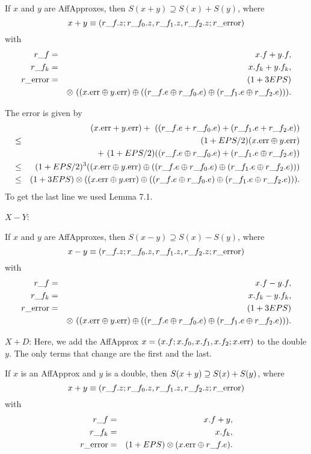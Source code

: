  If $x$ and $y$ are 
{\rm AffApproxes, }
then $S(x + y) \supseteq S(x) + S(y)${\rm ,} where
$$x + y \equiv (r\_f.z; r\_f_0.z, r\_f_1.z, r\_f_2.z; r\_{\rm error})$$
with
\begin{eqnarray*}
r\_f &=& x.f + y.f,\\
r\_f_k &=& x.f_k + y.f_k,\\
r\_{\rm error}& =& (1 + 3EPS)\\
&&\otimes\ ((x.{\rm err} \oplus y.{\rm err}) \oplus ((r\_f.e \oplus
r\_f_0.e) \oplus (r\_f_1.e \oplus r\_f_2.e))).
\end{eqnarray*}
\endproclaim

The error is given by 
\begin{eqnarray*}
&&\hskip-24pt (x.{\rm err} + y.{\rm err})  +\ ((r\_f.e + r\_f_0.e) + (r\_f_1.e + r\_f_2.e))\\
&\le& (1+EPS/2) (x.{\rm err} \oplus
y.{\rm err}) \\
&&+\ (1+EPS/2)((r\_f.e \oplus r\_f_0.e) + (r\_f_1.e \oplus r\_f_2.e))\\
&\le& (1+EPS/2)^3 ((x.{\rm err} \oplus
y.{\rm err}) \oplus ((r\_f.e \oplus r\_f_0.e) \oplus (r\_f_1.e \oplus r\_f_2.e)))\\
&\le& (1 + 3EPS) \otimes ((x.{\rm
err} \oplus y.{\rm err}) \oplus ((r\_f.e \oplus r\_f_0.e) \oplus (r\_f_1.e \oplus r\_f_2.e))).
\end{eqnarray*}
 To get the last line
we used Lemma 7.1. \enddemo

$X - Y$:

 If $x$ and $y$ are {\rm AffApproxes,} then $S(x - y) \supseteq S(x) - S(y)${\rm ,}
 where
$$x - y \equiv (r\_f.z; r\_f_0.z, r\_f_1.z, r\_f_2.z; r\_{\rm error})$$
with
\begin{eqnarray*}
r\_f& =& x.f - y.f,\\
r\_f_k &= &x.f_k - y.f_k,\\
r\_{\rm error} &=& (1 + 3EPS)\\
&& \otimes\ ((x.{\rm err} \oplus y.{\rm err}) \oplus ((r\_f.e
\oplus r\_f_0.e) \oplus (r\_f_1.e \oplus r\_f_2.e))).
\end{eqnarray*}
\endproclaim

$X + D$: 
Here, we add the AffApprox $x = (x.f; x.f_0,x.f_1,x.f_2; x.{\rm err})$  to the double $y$.  The only terms that change are the first and the last.

\hskip-8pt If $x$ is an 
{\rm AffApprox}  and $y$ is a double{\rm ,} 
then $S(x + y)\break \supseteq S(x) + S(y)${\rm ,} where
$$x + y \equiv (r\_f.z; r\_f_0.z, r\_f_1.z, r\_f_2.z; r\_{\rm error})$$
with
\begin{eqnarray*}
r\_f& =& x.f + y,\\
r\_f_k &=& x.f_k,\\
r\_{\rm error}& = &(1 + EPS) \otimes (x.{\rm err} \oplus r\_f.e).\end{eqnarray*}
\endproclaim

